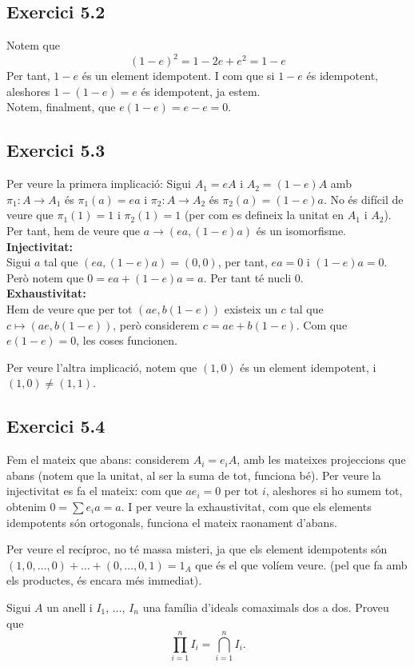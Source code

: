 \documentclass[11pt, a4paper]{article}
\begin{document}
\subsection{Exercici 5.2}
Notem que
\[
    (1-e)^2=1-2e+e^2=1-e
\]
Per tant, $1-e$ és un element idempotent. I com que si $1-e$ és idempotent, aleshores $1-(1-e)=e$ és idempotent, ja estem.\\
Notem, finalment, que $e(1-e)=e-e=0$.
\subsection{Exercici 5.3}
Per veure la primera implicació: Sigui $A_1=e A$ i $A_2=(1-e)A$ amb $\pi_1:A\to A_1$ és $\pi_1(a)=ea$ i $\pi_2:A\to A_2$ és $\pi_2(a)=(1-e)a$. No és difícil de veure que $\pi_1(1)=1$ i $\pi_2(1)=1$ (per com es defineix la unitat en $A_1$ i $A_2$). Per tant, hem de veure que $a\to (ea,(1-e)a)$ és un isomorfisme.\\
\textbf{Injectivitat:}\\
Sigui $a$ tal que $(ea,(1-e)a)=(0,0)$, per tant, $ea=0$ i $(1-e)a=0$. Però notem que $0=ea+(1-e)a=a$. Per tant té nucli 0.\\
\textbf{Exhaustivitat:}\\
Hem de veure que per tot $(ae,b(1-e))$ existeix un $c$ tal que $c\mapsto (ae,b(1-e))$, però considerem $c=ae+b(1-e)$. Com que $e(1-e)=0$, les coses funcionen.\par
Per veure l'altra implicació, notem que $(1,0)$ és un element idempotent, i $(1,0)\neq (1,1)$.
\subsection{Exercici 5.4}
Fem el mateix que abans: considerem $A_i=e_iA$, amb les mateixes projeccions que abans (notem que la unitat, al ser la suma de tot, funciona bé). Per veure la injectivitat es fa el mateix: com que $ae_i=0$ per tot $i$, aleshores si ho sumem tot, obtenim $0=\sum e_ia=a$. I per veure la exhaustivitat, com que els elements idempotents són ortogonals, funciona el mateix raonament d'abans.\par
Per veure el recíproc, no té massa misteri, ja que els element idempotents són $(1,0,\dots,0)+\dots+(0,\dots,0,1)=1_A$ que és el que volíem veure. (pel que fa amb els productes, és encara més immediat).
\newpage
\begin{tcolorbox}[title=\section{Exercici 6}]
    Sigui $A$ un anell i $I_1$, $\dots$, $I_n$ una família d'ideals comaximals dos a dos. Proveu que
    \[
        \prod_{i=1}^nI_i=\bigcap_{i=1}^nI_i.
    \]
\end{tcolorbox}
\end{document}
